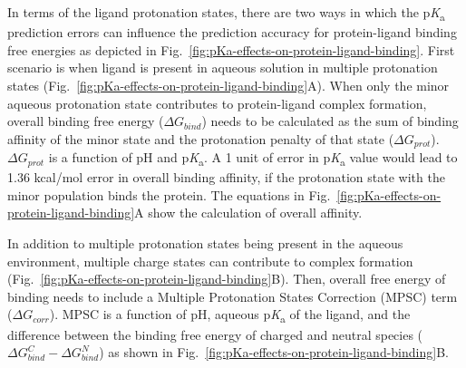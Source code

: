 \documentclass[9pt,lineno,final]{elife}
\newcommand{\pKa}{p\textit{K}\textsubscript{a}}
\begin{document}
In terms of the ligand protonation states, there are two ways in which the \pKa{} prediction errors can influence the prediction accuracy for protein-ligand binding free energies as depicted in Fig.~\ref{fig:pKa-effects-on-protein-ligand-binding}. First scenario is when ligand is present in aqueous solution in multiple protonation states (Fig.~\ref{fig:pKa-effects-on-protein-ligand-binding}A).
When only the minor aqueous protonation state contributes to protein-ligand complex formation, overall binding free energy ($\Delta G_{bind}$) needs to be calculated as the sum of binding affinity of the minor state and the protonation penalty of that state ($\Delta G_{prot}$). 
$\Delta G_{prot}$ is a function of pH and \pKa{}.
A 1 unit of error in \pKa{} value would lead to 1.36 kcal/mol error in overall binding affinity, if the protonation state with the minor population binds the protein. 
The equations in Fig.~\ref{fig:pKa-effects-on-protein-ligand-binding}A show the calculation of overall affinity.



In addition to multiple protonation states being present in the aqueous environment, multiple charge states can contribute to complex formation (Fig.~\ref{fig:pKa-effects-on-protein-ligand-binding}B). Then, overall free energy of binding needs to include a Multiple Protonation States Correction (MPSC) term ($\Delta G_{corr}$). MPSC is a function of pH, aqueous \pKa{} of the ligand, and the difference between the binding free energy of charged and neutral species ($\Delta G_{bind}^{C} - \Delta G_{bind}^{N}$) as shown in Fig.~\ref{fig:pKa-effects-on-protein-ligand-binding}B.


\end{document}

